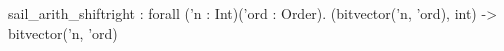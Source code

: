 sail_arith_shiftright : forall ('n : Int)('ord : Order). (bitvector('n, 'ord), int) -> bitvector('n, 'ord)